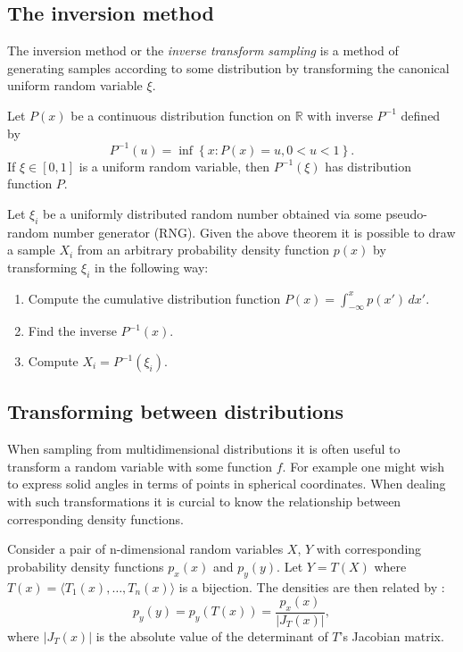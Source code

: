 \subsection{The inversion method}
The inversion method or the \emph{inverse transform sampling} \parencite{devroye86} is a method of generating samples according to some distribution by transforming the canonical uniform random variable $\xi$.
\begin{thm}
  Let $P(x)$ be a continuous distribution function on $\mathbb{R}$ with inverse $P^{-1}$ defined by
  \begin{equation}
    P^{-1}(u) = \inf \left\{ x:P(x)=u, 0 < u < 1 \right\}.
  \end{equation}
If $\xi \in [0,1]$ is a uniform random variable, then $P^{-1}(\xi)$ has distribution function $P$.
\end{thm}

Let $\xi_{i}$ be a uniformly distributed random number obtained via some pseudo-random number generator (RNG). Given the above theorem it is possible to draw a sample $X_{i}$ from an arbitrary probability density function $p(x)$ by transforming $\xi_{i}$ in the following way:
\begin{enumerate}
\item Compute the cumulative distribution function $P(x) = \int_{-\infty}^{x} p(x') \,dx'$.
\item Find the inverse $P^{-1}(x)$.
\item Compute $X_{i} = P^{-1}(\xi_{i})$.
\end{enumerate}

\subsection{Transforming between distributions}
When sampling from multidimensional distributions it is often useful to transform a random variable with some function $f$. For example one might wish to express solid angles in terms of points in spherical coordinates. When dealing with such transformations it is curcial to know the relationship between corresponding density functions.

Consider a pair of n-dimensional random variables $X$, $Y$ with corresponding probability density functions $p_{x}(x)$ and $p_{y}(y)$. Let $Y = T(X)$ where $T(x)=\langle T_{1}(x), \dots, T_{n}(x) \rangle$ is a bijection. The densities are then related by \parencite{phar2010}:
\begin{equation}
\label{eq:pdf_transform}
  p_{y}(y)=p_{y}(T(x)) = \frac{p_{x}(x)}{|J_{T}(x)|},
\end{equation}
where $|J_{T}(x)|$ is the absolute value of the determinant of $T$'s Jacobian matrix.

